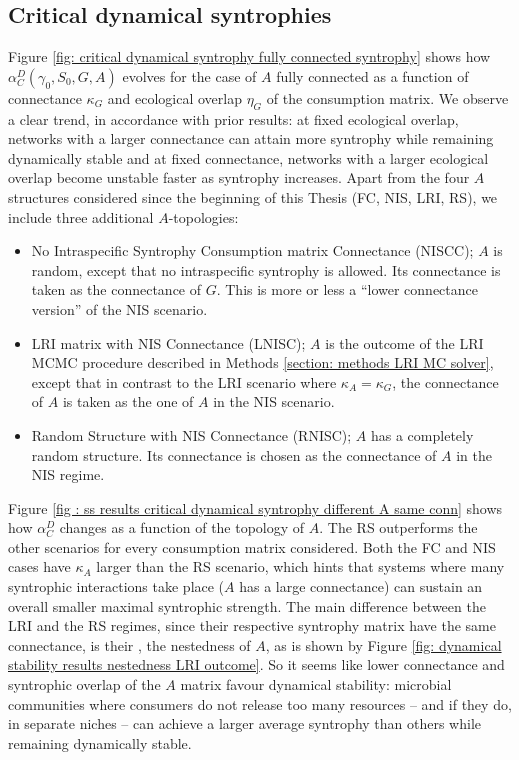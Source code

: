 \documentclass[12pt, titlepage]{report}
\begin{document}
\subsection{Critical dynamical syntrophies}\label{sec: results structural stability critical dynamical syntrophies}
Figure \ref{fig: critical dynamical syntrophy fully connected syntrophy} shows how $\alpha_C^D(\gamma_0, S_0, G, A)$ evolves for the case of $A$ fully connected as a function of connectance $\kappa_G$ and ecological overlap $\eta_G$ of the consumption matrix. We observe a clear trend, in accordance with prior results: at fixed ecological overlap, networks with a larger connectance can attain more syntrophy while remaining dynamically stable and at fixed connectance, networks with a larger ecological overlap become unstable faster as syntrophy increases. Apart from the four $A$ structures considered since the beginning of this Thesis (FC, NIS, LRI, RS), we include three additional $A$-topologies:
\begin{itemize}
\item No Intraspecific Syntrophy Consumption matrix Connectance (NISCC); $A$ is random, except that no intraspecific syntrophy is allowed. Its connectance is taken as the connectance of $G$. This is more or less a  ``lower connectance version'' of the NIS scenario.

\item LRI matrix with NIS Connectance (LNISC); $A$ is the outcome of the LRI MCMC procedure described in Methods \ref{section: methods LRI MC solver}, except that in contrast to the LRI scenario where $\kappa_A=\kappa_G$, the connectance of $A$ is taken as the one of $A$ in the NIS scenario.

\item Random Structure with NIS Connectance (RNISC); $A$ has a completely random structure. Its connectance is chosen as the connectance of $A$ in the NIS regime.
\end{itemize}
Figure \ref{fig : ss results critical dynamical syntrophy different A same conn} shows how $\alpha_C^D$ changes as a function of the topology of $A$. The RS outperforms the other scenarios for every consumption matrix considered. Both the FC and NIS cases have $\kappa_A$ larger than the RS scenario, which hints that systems where many syntrophic interactions take place (\ie $A$ has a large connectance) can sustain an overall smaller maximal syntrophic strength. The main difference between the LRI and the RS regimes, since their respective syntrophy matrix have the same connectance, is their , \ie the nestedness of $A$, as is shown by Figure \ref{fig: dynamical stability results nestedness LRI outcome}. So it seems like lower connectance and syntrophic overlap of the $A$ matrix favour dynamical stability: microbial communities where consumers do not release too many resources -- and if they do, in separate niches -- can achieve a larger average syntrophy than others while remaining dynamically stable.
\end{document}

